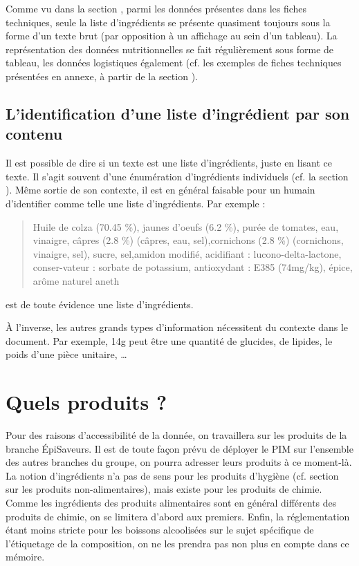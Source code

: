            Comme vu dans la section , parmi les données présentes dans les fiches techniques, seule la liste d'ingrédients se présente quasiment toujours sous la forme d'un texte brut (par opposition à un affichage au sein d'un tableau).
            La représentation des données nutritionnelles se fait régulièrement sous forme de tableau, les données logistiques également (cf. les exemples de fiches techniques présentées en annexe, à partir de la section ).
        
            \subsection{L'identification d'une liste d'ingrédient par son contenu}

            Il est possible de dire si un texte est une liste d'ingrédients, juste en lisant ce texte.
            Il s'agit souvent d'une énumération d'ingrédients individuels (cf. la section ).
            Même sortie de son contexte, il est en général faisable pour un humain d'identifier comme telle une liste d'ingrédients.
            Par exemple : 
            \begin{quotation}
                Huile de colza (70.45 \%), jaunes d’oeufs (6.2 \%), purée de tomates, eau, vinaigre, câpres (2.8 \%) (câpres, eau, sel),cornichons (2.8 \%) (cornichons, vinaigre, sel), sucre, sel,amidon modifié, acidifiant : lucono-delta-lactone, conser-vateur : sorbate de potassium, antioxydant : E385 (74mg/kg), épice, arôme naturel aneth
            \end{quotation}
            est de toute évidence une liste d'ingrédients.

            \`{A} l'inverse, les autres grands types d'information nécessitent du contexte dans le document.
            Par exemple, \og 14g \fg peut être une quantité de glucides, de lipides, le poids d'une pièce unitaire, \dots
            

        \section{Quels produits ?}
        
        Pour des raisons d'accessibilité de la donnée, on travaillera sur les produits de la branche \'{E}piSaveurs. 
        Il est de toute façon prévu de déployer le PIM sur l'ensemble des autres branches du groupe, on pourra adresser leurs produits à ce moment-là.
        La notion d'ingrédients n'a pas de sens pour les produits d'hygiène (cf. section  sur les produits non-alimentaires), mais existe pour les produits de chimie.
        Comme les ingrédients des produits alimentaires sont en général différents des produits de chimie, on se limitera d'abord aux premiers.
        Enfin, la réglementation étant moins stricte pour les boissons alcoolisées sur le sujet spécifique de l'étiquetage de la composition, on ne les prendra pas non plus en compte dans ce mémoire.

